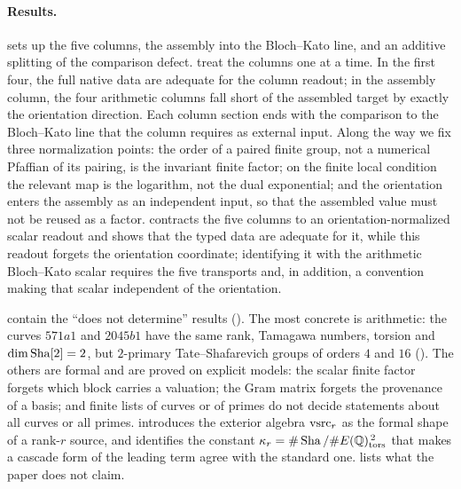 \paragraph{Results.}
 sets up the five columns, the assembly into the
Bloch--Kato line, and an additive splitting of the comparison defect.
treat the columns one at a time.  In the first four, the full native data
are adequate for the column readout; in the assembly column, the four
arithmetic columns fall short of the assembled target by exactly the
orientation direction.  Each column section ends with the comparison to
the Bloch--Kato line that the column requires as external input.  Along the way
we fix three normalization points: the order of a paired finite group,
not a numerical Pfaffian of its pairing, is the invariant finite factor;
on the finite local condition the relevant map is the logarithm, not the
dual exponential; and the orientation enters the assembly as an
independent input, so that the assembled value must not be reused as a
factor.   contracts the five columns to an
orientation-normalized scalar readout and shows that the typed data are
adequate for it, while this readout forgets the orientation coordinate;
identifying it with the arithmetic Bloch--Kato scalar requires the five
transports and, in addition, a convention making that scalar independent
of the orientation.

contain the ``does not determine'' results ().  The
most concrete is arithmetic: the curves $571a1$ and $2045b1$ have the same
rank, Tamagawa numbers, torsion and $\dim\operatorname{Sha}[2]=2$, but $2$-primary
Tate--Shafarevich groups of orders $4$ and $16$
().  The others are formal and are proved on
explicit models: the scalar finite factor forgets which block carries a
valuation; the Gram matrix forgets the provenance of a basis; and finite
lists of curves or of primes do not decide statements about all curves or
all primes.   introduces the exterior algebra $\mathrm{vsrc}_r$ as
the formal shape of a rank-$r$ source, and 
identifies the constant $\kappa_r=\#\operatorname{Sha}/\#E(\mathbb{Q})_{\operatorname{tors}}^{\,2}$ that makes a
cascade form of the leading term agree with the standard one.
 lists what the paper does not claim.

